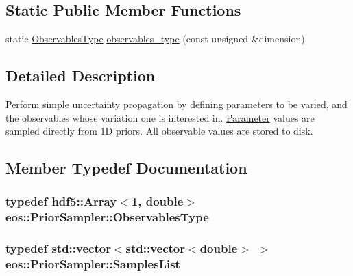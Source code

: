 \subsection*{Static Public Member Functions}
\begin{DoxyCompactItemize}
\item 
static \hyperlink{classeos_1_1hdf5_1_1Array}{ObservablesType} \hyperlink{classeos_1_1PriorSampler_a999109fc4dcf705444089aff091dc620}{observables\_\-type} (const unsigned \&dimension)
\end{DoxyCompactItemize}


\subsection{Detailed Description}
Perform simple uncertainty propagation by defining parameters to be varied, and the observables whose variation one is interested in. \hyperlink{classeos_1_1Parameter}{Parameter} values are sampled directly from 1D priors. All observable values are stored to disk. 

\subsection{Member Typedef Documentation}
\hypertarget{classeos_1_1PriorSampler_a7ae349c306b96abd4507bd2ea2e14b86}{
\subsubsection[{ObservablesType}]{\setlength{\rightskip}{0pt plus 5cm}typedef {\bf hdf5::Array}$<$1, double$>$ {\bf eos::PriorSampler::ObservablesType}}}
\label{classeos_1_1PriorSampler_a7ae349c306b96abd4507bd2ea2e14b86}
\hypertarget{classeos_1_1PriorSampler_a6da96aefb4891f1acb9366c8ffccd223}{
\subsubsection[{SamplesList}]{\setlength{\rightskip}{0pt plus 5cm}typedef std::vector$<$std::vector$<$double$>$ $>$ {\bf eos::PriorSampler::SamplesList}}}
\label{classeos_1_1PriorSampler_a6da96aefb4891f1acb9366c8ffccd223}


